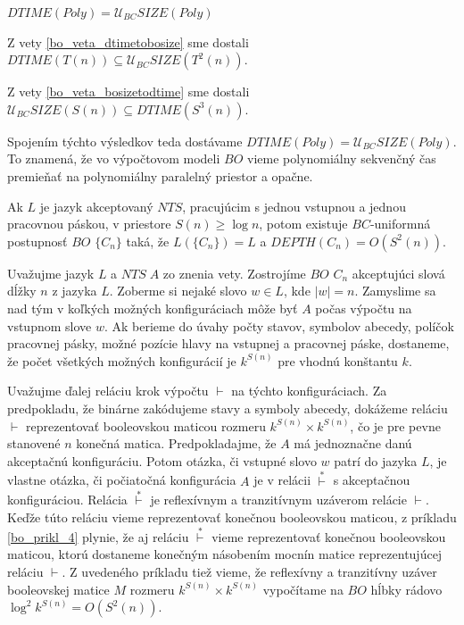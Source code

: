 {\begin{dosledok}
  $DTIME(Poly)=\mathcal{U}_{BC} SIZE(Poly)$
\end{dosledok}

\begin{dokaz}
  Z vety \ref{bo_veta_dtimetobosize} sme dostali
  $DTIME(T(n))\subseteq\mathcal{U}_{BC} SIZE(T^2(n))$.

  Z vety \ref{bo_veta_bosizetodtime} sme dostali $\mathcal{U}_{BC}
  SIZE(S(n))\subseteq DTIME(S^3(n))$.

  Spojením týchto výsledkov teda dostávame
  $DTIME(Poly)=\mathcal{U}_{BC} SIZE(Poly)$. To znamená, že vo
  výpočtovom modeli $BO$ vieme polynomiálny sekvenčný čas premieňať
  na polynomiálny paralelný priestor a opačne.
\end{dokaz}

\begin{veta}
  \label{bo_veta_nspacetobodepth}

  Ak $L$ je jazyk akceptovaný $NTS$, pracujúcim s jednou vstupnou a
  jednou pracovnou páskou, v priestore $S(n)\geq\log n$, potom
  existuje $BC$-uniformná postupnosť $BO$ $\{ C_n\}$ taká, že $L(\{
  C_n\})=L$ a $DEPTH(C_n)=O(S^2(n))$.
\end{veta}

\begin{dokaz}
  Uvažujme jazyk $L$ a $NTS\; A$ zo znenia vety. Zostrojíme $BO$
  $C_n$ akceptujúci slová dĺžky $n$ z jazyka $L$. Zoberme si nejaké
  slovo $w\in L$, kde $|w|=n$. Zamyslime sa nad tým v koľkých
  možných konfiguráciach môže byť $A$ počas výpočtu na vstupnom
  slove $w$. Ak berieme do úvahy počty stavov, symbolov abecedy,
  políčok pracovnej pásky, možné pozície hlavy na vstupnej a
  pracovnej páske, dostaneme, že počet všetkých možných konfigurácií
  je $k^{S(n)}$ pre vhodnú konštantu $k$.

  Uvažujme ďalej reláciu krok výpočtu $\vdash$ na týchto
  konfiguráciach. Za predpokladu, že binárne zakódujeme stavy a
  symboly abecedy, dokážeme reláciu $\vdash$ reprezentovať
  booleovskou maticou rozmeru $k^{S(n)}\times k^{S(n)}$, čo je pre
  pevne stanovené $n$ konečná matica. Predpokladajme, že $A$ má
  jednoznačne danú akceptačnú konfiguráciu. Potom otázka, či vstupné
  slovo $w$ patrí do jazyka $L$, je vlastne otázka, či počiatočná
  konfigurácia $A$ je v relácii $\overset{*}{\vdash}$ s akceptačnou
  konfiguráciou. Relácia $\overset{*}{\vdash}$ je reflexívnym a
  tranzitívnym uzáverom relácie $\vdash$. Keďže túto reláciu vieme
  reprezentovať konečnou booleovskou maticou, z príkladu
  \ref{bo_prikl_4} plynie, že aj reláciu $\overset{*}{\vdash}$ vieme
  reprezentovať konečnou booleovskou maticou, ktorú dostaneme
  konečným násobením mocnín matice reprezentujúcej reláciu $\vdash$.
  Z uvedeného príkladu tiež vieme, že reflexívny a tranzitívny
  uzáver booleovskej matice $M$ rozmeru $k^{S(n)}\times k^{S(n)}$
  vypočítame na $BO$ hĺbky rádovo $\log^2 k^{S(n)}=O(S^2(n))$.


\end{dokaz}}
